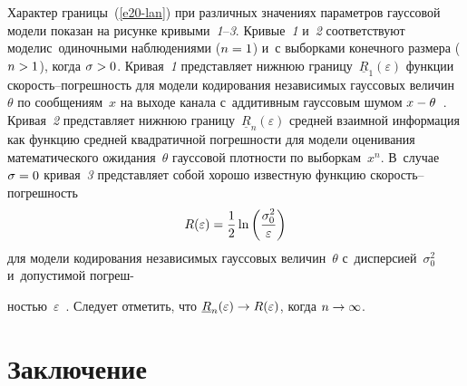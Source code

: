 \begin{multicols}{2}
Характер границы~(\ref{e20-lan}) при различных значениях параметров гауссовой модели 
показан на рисунке кривыми~\textit{1}--\textit{3}. Кривые~\textit{1} и~\textit{2} соответствуют 
модели\linebreak с~одиночными наблюдениями ($n\hm=1$) и~с выборками конечного размера 
($n\hm>1$), когда $\sigma\hm>0$. Кривая~\textit{1} представляет нижнюю 
границу~$\underline{R}_1(\varepsilon)$ функции ско\-рость--по\-греш\-ность для модели 
\mbox{кодирования} независимых гауссовых величин~$\theta$ по сообщениям~$x$ на выходе канала 
с~аддитивным гауссовым шумом $x\hm- \theta$~\cite{11-lan}. Кривая~\textit{2} представляет 
ниж\-нюю границу~$\underline{R}_n(\varepsilon)$ средней взаимной информация как функцию 
сред\-ней квад\-ра\-тич\-ной по\-греш\-ности для модели оценивания математического 
ожидания~$\theta$ гауссовой плот\-ности по выборкам~$x^n$. В~случае\linebreak $\sigma\hm=0$ 
кривая~\textit{3} пред\-став\-ля\-ет собой хорошо известную функцию ско\-рость--по\-греш\-ность 
$$
R(\varepsilon) = \displaystyle\frac{\displaystyle 1\mathstrut}{\displaystyle 2\mathstrut}\ln\left(\displaystyle\frac{\displaystyle \sigma_0^2\mathstrut}{\displaystyle \varepsilon\mathstrut}\right)
$$ 
для модели кодирования независимых 
гауссовых величин~$\theta$ с~дисперсией~$\sigma_0^2$ и~до\-пус\-ти\-мой 
по\-греш-\linebreak\vspace*{-12pt}

\columnbreak

\noindent
ностью~$\varepsilon$~\cite{9-lan}. Следует отметить, что $\underline{R}_n(\varepsilon) 
\hm\to R(\varepsilon)$, когда $n\hm\to \infty$.


\vspace*{-11pt}


\section{Заключение}

\vspace*{-4pt}


\end{multicols}

